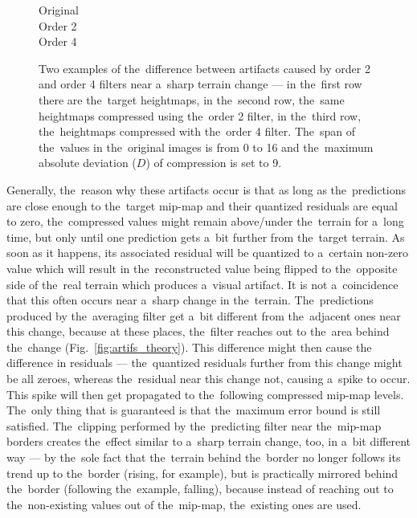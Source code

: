 \begin{figure}
	\begin{center}
	Original 
	 \\ 
	Order 2 
	 \\ 
	Order 4 
	 \\ 
	\end{center}
	\caption{Two examples of the~difference between artifacts caused by order 2 and order 4 filters near a~sharp terrain change --- in the~first row there are the~target heightmaps, in the~second row, the~same heightmaps compressed using the~order 2 filter, in the~third row, the~heightmaps compressed with the~order 4 filter. The~span of the~values in the~original images is from 0 to 16 and the~maximum absolute deviation ($D$) of compression is set to 9.}
	\label{fig:artifs_sharp_change}
\end{figure}

Generally, the~reason why these artifacts occur is that as long as the~predictions are close enough to the~target mip-map and their quantized residuals are equal to zero, the~compressed values might remain above/under the~terrain for a~long time, but only until one prediction gets a~bit further from the~target terrain. As soon as it happens, its associated residual will be quantized to a~certain non-zero value which will result in the~reconstructed value being flipped to the~opposite side of the~real terrain which produces a~visual artifact. It is not a~coincidence that this often occurs near a~sharp change in the~terrain. The~predictions produced by the~averaging filter get a~bit different from the~adjacent ones near this change, because at these places, the~filter reaches out to the~area behind the~change (Fig.~\ref{fig:artifs_theory}). This difference might then cause the difference in residuals --- the~quantized residuals further from this change might be all zeroes, whereas the~residual near this change not, causing a~spike to occur. This spike will then get propagated to the~following compressed mip-map levels. The~only thing that is guaranteed is that the~maximum error bound is still satisfied. The~clipping performed by the~predicting filter near the~mip-map borders creates the~effect similar to a~sharp terrain change, too, in a~bit different way --- by the~sole fact that the~terrain behind the~border no longer follows its trend up to the~border (rising, for example), but is practically mirrored behind the~border (following the~example, falling), because instead of reaching out to the~non-existing values out of the~mip-map, the~existing ones are used.

